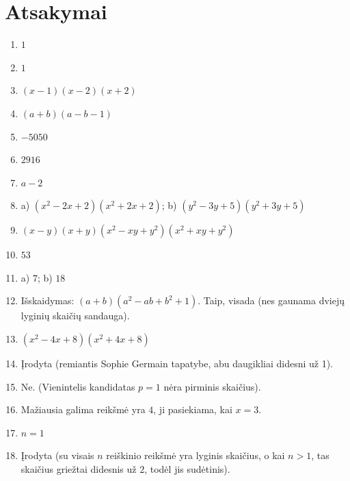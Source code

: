 \documentclass[11pt,a4paper]{scrartcl}
\begin{document}
\newpage
\section*{Atsakymai}

\begin{enumerate}
    \item $1$
    \item $1$
    \item $(x-1)(x-2)(x+2)$
    \item $(a+b)(a-b-1)$
    \item $-5050$
    \item $2916$
    \item $a-2$
    \item a) $(x^2-2x+2)(x^2+2x+2)$; b) $(y^2-3y+5)(y^2+3y+5)$
    \item $(x-y)(x+y)(x^2-xy+y^2)(x^2+xy+y^2)$
    \item $53$
    \item a) $7$; b) $18$
    \item Išskaidymas: $(a+b)(a^2-ab+b^2+1)$. Taip, visada (nes gaunama dviejų lyginių skaičių sandauga).
    \item $(x^2-4x+8)(x^2+4x+8)$
    \item Įrodyta (remiantis Sophie Germain tapatybe, abu daugikliai didesni už 1).
    \item Ne. (Vienintelis kandidatas $p=1$ nėra pirminis skaičius).
    \item Mažiausia galima reikšmė yra $4$, ji pasiekiama, kai $x=3$.
    \item $n=1$
    \item Įrodyta (su visais $n$ reiškinio reikšmė yra lyginis skaičius, o kai $n>1$, tas skaičius griežtai didesnis už $2$, todėl jis sudėtinis).
\end{enumerate}
\end{document}
